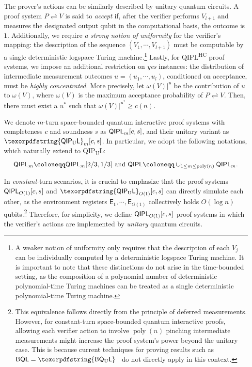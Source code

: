 \documentclass[11pt, a4paper]{article}
\numberwithin{equation}{section}
\numberwithin{figure}{section}
\newcommand{\QIPL}{\textnormal{\textsf{QIPL}}\xspace}
\newcommand{\QIPUL}{\texorpdfstring{\textnormal{\textsf{QIP}\textsubscript{\textnormal{U}}\textsf{L}}}\xspace}
\newcommand{\QIPLHC}{\texorpdfstring{\textnormal{\textsf{QIPL}\textsuperscript{\textnormal{HC}}}}\xspace}
\newcommand{\protocol}[2]{{#1}\!\rightleftharpoons\!{#2}}
\newcommand{\BQL}{\textnormal{\textsf{BQL}}\xspace}
\newcommand{\BQUL}{\texorpdfstring{\textnormal{\textsf{BQ}\textsubscript{U}\textsf{L}}}\xspace}
\DeclareMathOperator\poly{poly}
\newcommand{\sfE}{\mathsf{E}}
\begin{document}
The prover's actions can be similarly described by unitary quantum circuits. A proof system $\protocol{P}{V}$ is said to \textit{accept} if, after the verifier performs $V_{l+1}$ and measures the designated output qubit in the computational basis, the outcome is $1$. 
Additionally, we require \textit{a strong notion of uniformity} for the verifier's mapping: the description of the sequence $(V_1,\cdots,V_{l+1})$ must be computable by a single deterministic logspace Turing machine.\footnote{A weaker notion of uniformity only requires that the description of each $V_j$ can be individually computed by a deterministic logspace Turing machine. It is important to note that these distinctions do not arise in the time-bounded setting, as the composition of a polynomial number of deterministic polynomial-time Turing machines can be treated as a single deterministic polynomial-time Turing machine.} 
Lastly, for \QIPLHC{} proof systems, we impose an additional restriction on \textit{yes} instances: the distribution of intermediate measurement outcomes $u = (u_1,\cdots,u_l)$, conditioned on acceptance, must be \textit{highly concentrated}. More precisely, let $\omega(V)|^u$ be the contribution of $u$ to $\omega(V)$, where $\omega(V)$ is the maximum acceptance probability of $\protocol{P}{V}$. Then, there must exist a $u^*$ such that $\omega(V)|^{u^*} \geq c(n)$.

We denote $m$-turn space-bounded quantum interactive proof systems with completeness $c$ and soundness $s$ as $\QIPL_m[c,s]$, and their unitary variant as $\QIPUL_m[c,s]$. 
In particular, we adopt the following notations, which naturally extend to \QIPUL{}: 
\[ \QIPL_m \coloneqq \QIPL_m[2/3,1/3] \text{ and } \QIPL \coloneqq \cup_{1 \leq m \leq \poly(n)} \QIPL_m.\]

In \textit{constant}-turn scenarios, it is crucial to emphasize that the proof systems $\QIPL_{O(1)}[c,s]$ and $\QIPUL_{O(1)}[c,s]$ can directly simulate each other, as the environment registers $\sfE_1,\cdots,\sfE_{O(1)}$ collectively holds $O(\log{n})$ qubits.\footnote{This equivalence follows directly from the principle of deferred measurements. However, for constant-turn space-bounded quantum interactive proofs, allowing each verifier action to involve $\poly(n)$ pinching intermediate measurements might increase the proof system's power beyond the unitary case. This is because current techniques for proving results such as $\BQL = \BQUL$~\cite{FR21,GRZ21,GR22} do not directly apply in this context.\label{footref:constant-turn-QIPL}} Therefore, for simplicity, we define $\QIPL_{O(1)}[c,s]$ proof systems in which the verifier's actions are implemented by \textit{unitary} quantum circuits. 
\end{document}
